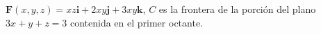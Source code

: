 \item $\mathbf{F}(x, y, z) = xz \mathbf{i} + 2xy \mathbf{j} + 3xy \mathbf{k}$, $C$ es la frontera de la porción del plano $3x + y + z = 3$ contenida en el primer octante.
